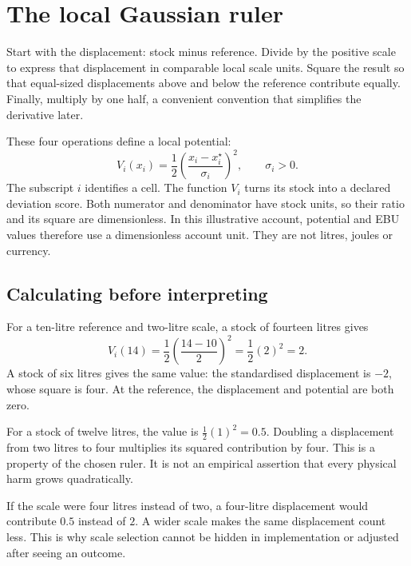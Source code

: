 \chapter{The local Gaussian ruler}\label{ch:gaussian}

Start with the displacement: stock minus reference. Divide by the positive scale to express that displacement in comparable local scale units. Square the result so that equal-sized displacements above and below the reference contribute equally. Finally, multiply by one half, a convenient convention that simplifies the derivative later.

These four operations define a local potential:
\begin{equation}\label{eq:local}
 V_i(x_i)=\frac12\left(\frac{x_i-x_i^\star}{\sigma_i}\right)^2,
 \qquad \sigma_i>0.
\end{equation}
The subscript $i$ identifies a cell. The function $V_i$ turns its stock into a declared deviation score. Both numerator and denominator have stock units, so their ratio and its square are dimensionless. In this illustrative account, potential and EBU values therefore use a dimensionless account unit. They are not litres, joules or currency.

\section{Calculating before interpreting}
For a ten-litre reference and two-litre scale, a stock of fourteen litres gives
\begin{equation}
 V_i(14)=\frac12\left(\frac{14-10}{2}\right)^2
 =\frac12(2)^2=2.
\end{equation}
A stock of six litres gives the same value: the standardised displacement is $-2$, whose square is four. At the reference, the displacement and potential are both zero.

For a stock of twelve litres, the value is $\tfrac12(1)^2=0.5$. Doubling a displacement from two litres to four multiplies its squared contribution by four. This is a property of the chosen ruler. It is not an empirical assertion that every physical harm grows quadratically.

If the scale were four litres instead of two, a four-litre displacement would contribute $0.5$ instead of $2$. A wider scale makes the same displacement count less. This is why scale selection cannot be hidden in implementation or adjusted after seeing an outcome.

